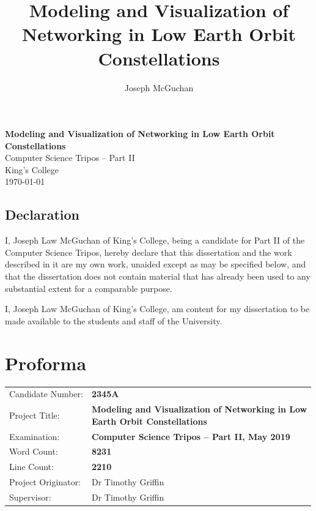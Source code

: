\documentclass[12pt,a4paper,twoside,openright]{report}
\begin{document}
\title{Modeling and Visualization of Networking in Low Earth Orbit Constellations}
\author{Joseph McGuchan}

\pagestyle{empty}


\vspace*{60mm}
\begin{center}
\Huge
\textbf{Modeling and Visualization of Networking in Low Earth Orbit Constellations} \\[5mm]
Computer Science Tripos -- Part II \\[5mm]
King's College \\[5mm]
\today  %
\end{center}

 
\newpage
\section*{Declaration}

I, Joseph Law McGuchan of King's College, being a candidate for Part II of the Computer Science Tripos, hereby declare that this dissertation and the work described in it are my own work, unaided except as may be specified below, and that the dissertation does not contain material that has already been used to any substantial extent for a comparable purpose.

I, Joseph Law McGuchan of King's College, 
am content for my dissertation to be made available to the students and staff of the University.

\bigskip
{}

\medskip
{}


\pagestyle{plain}

\chapter*{Proforma}

{\large
\begin{tabular}{l|l}
Candidate Number:               & \bf 2345A                       \\
Project Title:      & \makecell{\bf Modeling and Visualization of Networking in Low \\ \bf Earth Orbit Constellations} \\
Examination:        & \bf Computer Science Tripos -- Part II, May 2019  \\
Word Count:         & \bf 8231 \\
Line Count: & \bf 2210 \\
Project Originator: &  Dr Timothy Griffin                    \\
Supervisor:         & Dr Timothy Griffin                    \\ 
\end{tabular}
}
\end{document}
